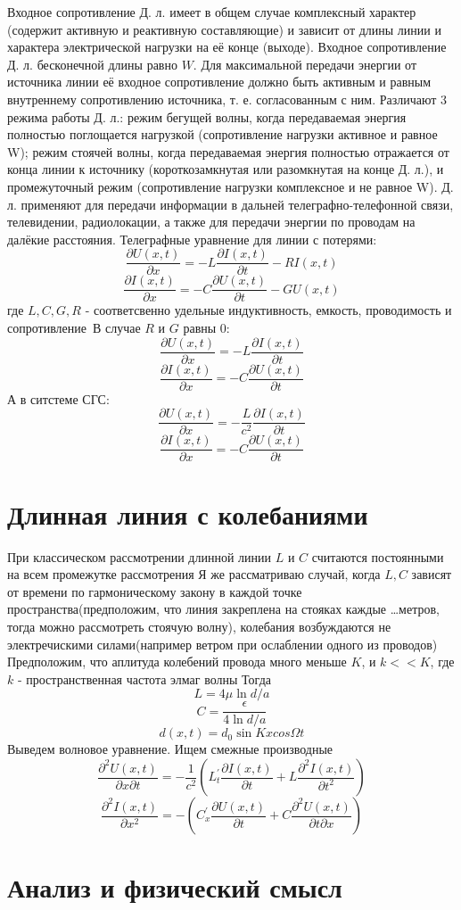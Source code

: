 \documentclass[a4paper, 12pt]{article}
\begin{document}
Входное сопротивление Д. л. имеет в общем случае комплексный характер (содержит активную и реактивную составляющие) и зависит от длины линии и характера электрической нагрузки на её конце (выходе). Входное сопротивление Д. л. бесконечной длины равно $W$. Для максимальной передачи энергии от источника линии её входное сопротивление должно быть активным и равным внутреннему сопротивлению источника, т. е. согласованным с ним. Различают 3 режима работы Д. л.: режим бегущей волны, когда передаваемая энергия полностью поглощается нагрузкой (сопротивление нагрузки активное и равное W); режим стоячей волны, когда передаваемая энергия полностью отражается от конца линии к источнику (короткозамкнутая или разомкнутая на конце Д. л.), и промежуточный режим (сопротивление нагрузки комплексное и не равное W). Д. л. применяют для передачи информации в дальней телеграфно-телефонной связи, телевидении, радиолокации, а также для передачи энергии по проводам на далёкие расстояния.
Телеграфные уравнение для линии с потерями:
\[\frac{\partial U(x,t)}{\partial x} = -L \frac{\partial I(x,t)}{\partial t} - RI(x,t)\]
\[\frac{\partial I(x,t)}{\partial x} = -C \frac{\partial U(x,t)}{\partial t} - GU(x,t)\]
где $L, C, G, R$ - соответсвенно удельные индуктивность, емкость, проводимость и сопротивление\
В случае $R$ и $G$ равны $0$:
\[\frac{\partial U(x,t)}{\partial x} = -L \frac{\partial I(x,t)}{\partial t}\]
\[\frac{\partial I(x,t)}{\partial x} = -C \frac{\partial U(x,t)}{\partial t}\]
А в ситстеме СГС:
\[\frac{\partial U(x,t)}{\partial x} = -\frac{L}{c^2} \frac{\partial I(x,t)}{\partial t}\]
\[\frac{\partial I(x,t)}{\partial x} = -C \frac{\partial U(x,t)}{\partial t}\]

\section{Длинная линия с колебаниями}
При классическом рассмотрении длинной линии $L$ и $C$ считаются постоянными на всем промежутке рассмотрения
Я же рассматриваю случай, когда $L, C$ зависят от времени по гармоническому закону в каждой точке пространства(предположим, что линия закреплена на стояках каждые \dots метров, тогда можно рассмотреть стоячую волну), колебания возбуждаются не электречискими силами(например ветром при ослаблении одного из проводов)
Предположим, что аплитуда колебений провода много меньше $K$, и $k<<K$, где $k$ - пространственная частота элмаг волны 
Тогда
\[L = 4\mu \ln{d/a}\]
\[C = \frac{\epsilon}{4\ln{d/a}}\]
\[d(x, t) = d_0\sin{Kx}cos{\Omega t}\]
Выведем волновое уравнение. Ищем смежные производные
\[\frac{\partial^2 U(x,t)}{\partial x \partial t} = -\frac{1}{c^2}(L^{\prime}_{t} \frac{\partial I(x,t)}{\partial t} + L \frac{\partial^2 I(x,t)}{\partial t^2})\]
\[\frac{\partial^2 I(x,t)}{\partial x^2} = -(C^{\prime}_{x} \frac{\partial U(x,t)}{\partial t} + C \frac{\partial^2 U(x,t)}{\partial t \partial x})\]


\newpage

\section{Анализ и физический смысл}
\end{document}
